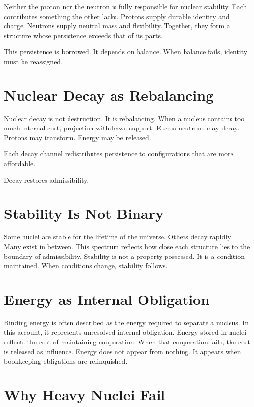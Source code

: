 \documentclass[11pt,twoside,openright]{book}
\begin{document}
Neither the proton nor the neutron is fully responsible for nuclear stability. Each contributes something the other lacks. Protons supply durable identity and charge. Neutrons supply neutral mass and flexibility. Together, they form a structure whose persistence exceeds that of its parts.

This persistence is borrowed. It depends on balance. When balance fails, identity must be reassigned.

\section*{Nuclear Decay as Rebalancing}

Nuclear decay is not destruction. It is rebalancing. When a nucleus contains too much internal cost, projection withdraws support. Excess neutrons may decay. Protons may transform. Energy may be released.

Each decay channel redistributes persistence to configurations that are more affordable.

Decay restores admissibility.

\section*{Stability Is Not Binary}

Some nuclei are stable for the lifetime of the universe. Others decay rapidly. Many exist in between. This spectrum reflects how close each structure lies to the boundary of admissibility. Stability is not a property possessed. It is a condition maintained. When conditions change, stability follows.

\section*{Energy as Internal Obligation}

Binding energy is often described as the energy required to separate a nucleus. In this account, it represents unresolved internal obligation. Energy stored in nuclei reflects the cost of maintaining cooperation. When that cooperation fails, the cost is released as influence. Energy does not appear from nothing. It appears when bookkeeping obligations are relinquished.

\section*{Why Heavy Nuclei Fail}
\end{document}
